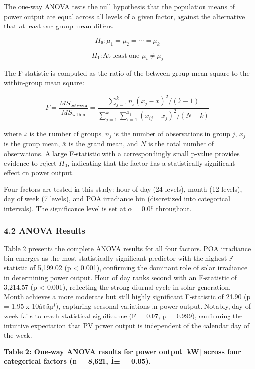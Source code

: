 \documentclass[
  11pt,
]{article}
\begin{document}
The one-way ANOVA tests the null hypothesis that the population means of
power output are equal across all levels of a given factor, against the
alternative that at least one group mean differs:

\[H_0: \mu_1 = \mu_2 = \cdots = \mu_k\]

\[H_1: \text{At least one } \mu_i \neq \mu_j\]

The F-statistic is computed as the ratio of the between-group mean
square to the within-group mean square:

\[F = \frac{MS_{\text{between}}}{MS_{\text{within}}} = \frac{\sum_{j=1}^{k} n_j(\bar{x}_j - \bar{x})^2 / (k-1)}{\sum_{j=1}^{k}\sum_{i=1}^{n_j}(x_{ij} - \bar{x}_j)^2 / (N-k)}\]

where \(k\) is the number of groups, \(n_j\) is the number of
observations in group \(j\), \(\bar{x}_j\) is the group mean,
\(\bar{x}\) is the grand mean, and \(N\) is the total number of
observations. A large F-statistic with a correspondingly small p-value
provides evidence to reject \(H_0\), indicating that the factor has a
statistically significant effect on power output.

Four factors are tested in this study: hour of day (24 levels), month
(12 levels), day of week (7 levels), and POA irradiance bin (discretized
into categorical intervals). The significance level is set at
\(\alpha = 0.05\) throughout.

\subsubsection{4.2 ANOVA Results}\label{anova-results}

Table 2 presents the complete ANOVA results for all four factors. POA
irradiance bin emerges as the most statistically significant predictor
with the highest F-statistic of 5,199.02 (p \textless{} 0.001),
confirming the dominant role of solar irradiance in determining power
output. Hour of day ranks second with an F-statistic of 3,214.57 (p
\textless{} 0.001), reflecting the strong diurnal cycle in solar
generation. Month achieves a more moderate but still highly significant
F-statistic of 24.90 (p = 1.95 x 10â»âµ¹), capturing seasonal variations
in power output. Notably, day of week fails to reach statistical
significance (F = 0.07, p = 0.999), confirming the intuitive expectation
that PV power output is independent of the calendar day of the week.

\textbf{Table 2: One-way ANOVA results for power output {[}kW{]} across
four categorical factors (n = 8,621, Î± = 0.05).}
\end{document}

